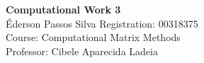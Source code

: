 \documentclass[12pt, a4paper]{article}
\begin{document}
\begin{center}
    {\Large \textbf{Computational Work 3}} \\[0.5em]
    {\large Éderson Passos Silva \quad Registration: 00318375} \\[0.2em]
    {\normalsize Course: Computational Matrix Methods} \\
    {\normalsize Professor: Cibele Aparecida Ladeia}
\end{center}
\vspace{1em}











\newpage
\appendix

\end{document}
